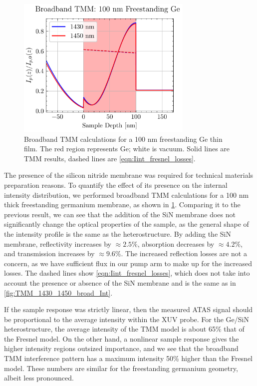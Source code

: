 \begin{figure}
	\centering
	\includegraphics[width=0.75\textwidth]{figures/chap4/Ge_1430_1450_broad_Int.pdf}
	\caption{Broadband TMM calculations for a {100 nm} freestanding Ge thin film. The red region represents Ge; white is vacuum. Solid lines are TMM results, dashed lines are \cref{eqn:Iint_fresnel_losses}.}
	\label{fig:Ge_1430_1450_broad_Int}
\end{figure}

The presence of the silicon nitride membrane was required for technical materials preparation reasons. To quantify the effect of its presence on the internal intensity distribution, we performed broadband TMM calculations for a 100 nm thick freestanding germanium membrane, as shown in \cref{fig:Ge_1430_1450_broad_Int}. Comparing it to the previous result, we can see that the addition of the SiN membrane does not significantly change the optical properties of the sample, as the general shape of the intensity profile is the same as the heterostructure. By adding the SiN membrane, reflectivity increases by $\approx 2.5\%$, absorption decreases by $\approx 4.2\%$, and transmission increases by $\approx 9.6\%$. The increased reflection losses are not a concern, as we have sufficient flux in our pump arm to make up for the increased losses. The dashed lines show \cref{eqn:Iint_fresnel_losses}, which does not take into account the presence or absence of the SiN membrane and is the same as in \cref{fig:TMM_1430_1450_broad_Int}.

If the sample response was strictly linear, then the measured ATAS signal should be proportional to the average intensity within the XUV probe. For the Ge/SiN heterostructure, the average intensity of the TMM model is about 65\% that of the Fresnel model. On the other hand, a nonlinear sample response gives the higher intensity regions outsized importance, and we see that the broadband TMM interference pattern has a maximum intensity 50\% higher than the Fresnel model. These numbers are similar for the freestanding germanium geometry, albeit less pronounced.

